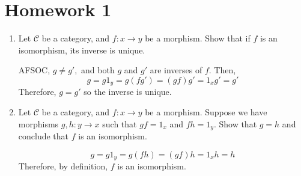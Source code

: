\section{Homework 1}
\begin{enumerate}
    \item Let $\mathcal{C}$ be a category, and $f : x \to y$ be a morphism. Show that if $f$ is an isomorphism, its inverse is unique. 
    \begin{soln}
        AFSOC, $g \ne g',$ and both $g$ and $g'$ are inverses of $f.$ Then, 
        \begin{equation}
            g = g1_y = g(fg') = (gf)g' = 1_x g' = g'
        \end{equation} Therefore, $g=g'$ so the inverse is unique.
    \end{soln}
    \item Let $\mathcal{C}$ be a category, and $f : x \to y$ be a morphism. Suppose we have morphisms $g, h : y \to x$ such that $gf = 1_x$ and $fh = 1_y$. Show that 
$g = h$ and conclude that $f$ is an isomorphism. 
    \begin{soln}
        \begin{equation}
            g = g 1_y = g(fh) = (gf) h = 1_x h = h
        \end{equation} 
        Therefore, by definition, $f$ is an isomorphism.
    \end{soln}
\end{enumerate}

